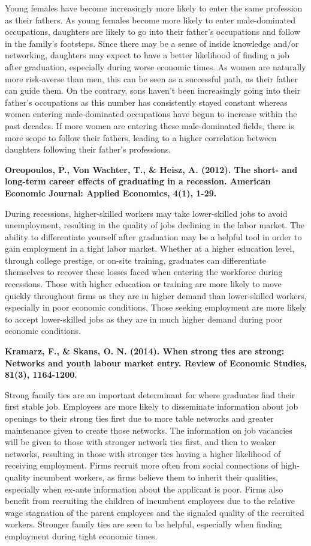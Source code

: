 \documentclass[12pt]{article}
\begin{document}
	Young females have become increasingly more likely to enter the same profession as their fathers. As young females become more likely to enter male-dominated occupations, daughters are likely to go into their father’s occupations and follow in the family's footsteps. Since there may be a sense of inside knowledge and/or networking, daughters may expect to have a better likelihood of finding a job after graduation, especially during worse economic times. As women are naturally more risk-averse than men, this can be seen as a successful path, as their father can guide them. On the contrary, sons haven’t been increasingly going into their father's occupations as this number has consistently stayed constant whereas women entering male-dominated occupations have begun to increase within the past decades. If more women are entering these male-dominated fields, there is more scope to follow their fathers, leading to a higher correlation between daughters following their father’s professions. 


\textbf{ Oreopoulos, P., Von Wachter, T., & Heisz, A. (2012). The short- and long-term career effects of graduating in a recession. American Economic Journal: Applied Economics, 4(1), 1-29.}
	
    During recessions, higher-skilled workers may take lower-skilled jobs to avoid unemployment, resulting in the quality of jobs declining in the labor market. The ability to differentiate yourself after graduation may be a helpful tool in order to gain employment in a tight labor market. Whether at a higher education level, through college prestige, or on-site training, graduates can differentiate themselves to recover these losses faced when entering the workforce during recessions. Those with higher education or training are more likely to move quickly throughout firms as they are in higher demand than lower-skilled workers, especially in poor economic conditions. Those seeking employment are more likely to accept lower-skilled jobs as they are in much higher demand during poor economic conditions.

 \textbf{Kramarz, F., & Skans, O. N. (2014). When strong ties are strong: Networks and youth labour market entry. Review of Economic Studies, 81(3), 1164-1200.}
	
    Strong family ties are an important determinant for where graduates find their first stable job. Employees are more likely to disseminate information about job openings to their strong ties first due to more table networks and greater maintenance given to create those networks. The information on job vacancies will be given to those with stronger network ties first, and then to weaker networks, resulting in those with stronger ties having a higher likelihood of receiving employment. Firms recruit more often from social connections of high-quality incumbent workers, as firms believe them to inherit their qualities, especially when ex-ante information about the applicant is poor. Firms also benefit from recruiting the children of incumbent employees due to the relative wage stagnation of the parent employees and the signaled quality of the recruited workers. Stronger family ties are seen to be helpful, especially when finding employment during tight economic times. 
\end{document}
